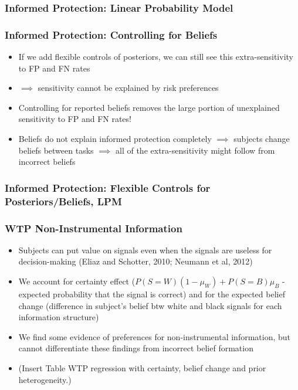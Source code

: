 \documentclass[11pt,hyperref={bookmarks=false}]{beamer}
\begin{document}
\begin{frame}
\frametitle{Informed Protection: Linear Probability Model}
\scriptsize

\end{frame}



\begin{frame}
\frametitle{Informed Protection: Controlling for Beliefs}
\begin{itemize}
\item If we add flexible controls of posteriors, we can still see this extra-sensitivity to FP and FN rates 
\item $\implies$ sensitivity cannot be explained by risk preferences
\item Controlling for reported beliefs removes the large portion of unexplained sensitivity to FP and FN rates!
\item Beliefs do not explain informed protection completely $\implies$ subjects change beliefs between tasks $\implies$ all of the extra-sensitivity might follow from incorrect beliefs
\end{itemize}
\end{frame}



\begin{frame}
\frametitle{Informed Protection: Flexible Controls for Posteriors/Beliefs, LPM}
\scriptsize

\end{frame}



\begin{frame}
\frametitle{WTP Non-Instrumental Information}
\begin{itemize}
\item Subjects can put value on signals even when the signals are useless for decision-making (Eliaz and Schotter, 2010; Neumann et al, 2012)
\item We account for certainty effect ($P(S=W)(1-\mu_W)+P(S=B)\mu_B$ - expected probability that the signal is correct) and for the expected belief change (difference in subject's belief btw white and black signals for each information structure)
\item We find some evidence of preferences for non-instrumental information, but cannot differentiate these findings from incorrect belief formation
\item (Insert Table WTP regression with certainty, belief change and prior heterogeneity.)
\end{itemize}
\end{frame}
\end{document}
